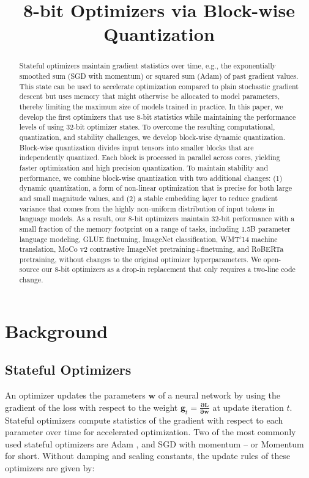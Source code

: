 \title{8-bit Optimizers via Block-wise Quantization}

\begin{abstract}
Stateful optimizers maintain gradient statistics over time, e.g., the exponentially smoothed sum (SGD with momentum) or squared sum (Adam) of past gradient values. This state can be used to accelerate optimization compared to plain stochastic gradient descent but uses memory that might otherwise be allocated to model parameters, thereby limiting the maximum size of models trained in practice. In this paper, we develop the first optimizers that use 8-bit statistics while maintaining the performance levels of using 32-bit optimizer states. To overcome the resulting computational, quantization, and stability challenges, we develop block-wise dynamic quantization. Block-wise quantization divides input tensors into smaller blocks that are independently quantized. Each block is processed in parallel across cores, yielding faster optimization and high precision quantization. To maintain stability and performance, we combine block-wise quantization with two additional changes: (1) dynamic quantization, a form of non-linear optimization that is precise for both large and small magnitude values, and (2) a stable embedding layer to reduce gradient variance that comes from the highly non-uniform distribution of input tokens in language models. As a result, our 8-bit optimizers maintain 32-bit performance with a small fraction of the memory footprint on a range of tasks, including 1.5B parameter language modeling, GLUE finetuning, ImageNet classification, WMT'14 machine translation, MoCo v2 contrastive ImageNet pretraining+finetuning, and RoBERTa pretraining, without changes to the original optimizer hyperparameters. We open-source our 8-bit optimizers as a drop-in replacement that only requires a two-line code change.
\end{abstract}

\section{Background}

\subsection{Stateful Optimizers}
\label{section:optim}

An optimizer updates the parameters $\mathbf{w}$ of a neural network by using the gradient of the loss with respect to the weight $\mathbf{g}_t=\frac{\mathbf{\partial L}}{\mathbf{\partial w}}$ at update iteration $t$. Stateful optimizers compute statistics of the gradient with respect to each parameter over time for accelerated optimization. Two of the most commonly used stateful optimizers are Adam \citep{kingma2014adam}, and SGD with momentum \citep{Qian1999OnTM} -- or Momentum for short. Without damping and scaling constants, the update rules of these optimizers are given by:

